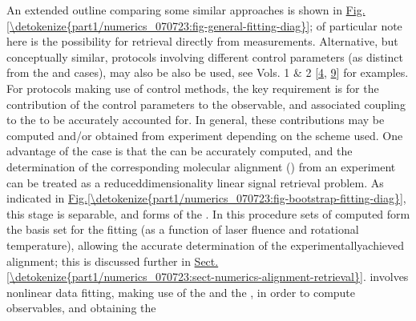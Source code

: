 \documentclass[letterpaper,table,10pt,english]{jupyterBook}
\begin{document}
\sphinxAtStartPar
An extended outline comparing some similar approaches is shown in \hyperref[\detokenize{part1/numerics_070723:fig-general-fitting-diag}]{Fig.\@ \ref{\detokenize{part1/numerics_070723:fig-general-fitting-diag}}}; of particular note here is the possibility for retrieval directly from {\hyperref[\detokenize{backmatter/glossary:term-MF}]{}} measurements. Alternative, but conceptually similar, protocols involving different control parameters (as distinct from the {\hyperref[\detokenize{backmatter/glossary:term-RWP}]{}} and {\hyperref[\detokenize{backmatter/glossary:term-MF}]{}} cases), may also be also be used, see  Vols. 1 \& 2 {[}\hyperlink{cite.backmatter/bibliography:id675}{4}, \hyperlink{cite.backmatter/bibliography:id676}{9}{]} for examples. For protocols making use of control methods, the key requirement is for the contribution of the control parameters to the observable, and associated coupling to the {\hyperref[\detokenize{backmatter/glossary:term-channel-functions}]{}} to be accurately accounted for. In general, these contributions may be computed and/or obtained from experiment depending on the scheme used. One advantage of the {\hyperref[\detokenize{backmatter/glossary:term-RWP}]{}} case is that the {\hyperref[\detokenize{backmatter/glossary:term-RWP}]{}} can be accurately computed, and the determination of the corresponding molecular alignment ({\hyperref[\detokenize{backmatter/glossary:term-ADMs}]{}}) from an experiment can be treated as a reduced\sphinxhyphen{}dimensionality linear signal retrieval problem. As indicated in \hyperref[\detokenize{part1/numerics_070723:fig-bootstrap-fitting-diag}]{Fig.\@ \ref{\detokenize{part1/numerics_070723:fig-bootstrap-fitting-diag}}}, this stage is separable, and forms  of the {\hyperref[\detokenize{backmatter/glossary:term-bootstrap-retrieval-protocol}]{}}. In this procedure sets of computed {\hyperref[\detokenize{backmatter/glossary:term-ADMs}]{}} form the basis set for the fitting (as a function of laser fluence and rotational temperature), allowing the accurate determination of the experimentally\sphinxhyphen{}achieved alignment; this is discussed further in \hyperref[\detokenize{part1/numerics_070723:sect-numerics-alignment-retrieval}]{Sect.\@ \ref{\detokenize{part1/numerics_070723:sect-numerics-alignment-retrieval}}}.  involves non\sphinxhyphen{}linear data fitting, making use of the {\hyperref[\detokenize{backmatter/glossary:term-ADMs}]{}} and the {\hyperref[\detokenize{backmatter/glossary:term-channel-functions}]{}}, in order to compute observables, and obtaining the 
\end{document}
